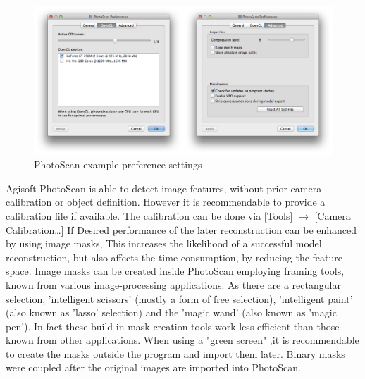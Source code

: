\documentclass[12pt,a4paper]{scrartcl}
\begin{document}
\begin{figure}[!h]
  \includegraphics[width=1\textwidth]{PhotoScan-setup}

  \caption{PhotoScan example preference settings}

  \label{fig:photoscansetup}
\end{figure}

Agisoft PhotoScan is able to detect image features, without prior camera calibration or object definition. However it is recommendable to provide a calibration file if available. The calibration can be done via [Tools] $\rightarrow$ [Camera Calibration\dots] If Desired performance of the later reconstruction can be enhanced by using image masks, This increases the likelihood of a successful model reconstruction, but also affects the time consumption, by reducing the feature space. Image masks can be created inside PhotoScan employing framing tools, known from various image-processing applications. As there are a rectangular selection, 'intelligent scissors' (mostly a form of free selection), 'intelligent paint' (also known as 'lasso' selection) and the 'magic wand' (also known as 'magic pen'). In fact these build-in mask creation tools work less efficient than those known from other applications. When using a "green screen" ,it is recommendable to create the masks outside the program and import them later.
Binary masks were coupled after the original images are imported into PhotoScan.
\end{document}
